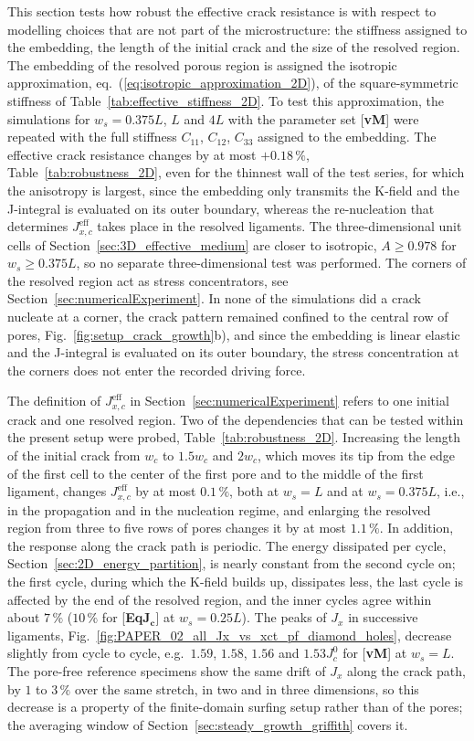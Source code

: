 \documentclass[pdflatex,sn-mathphys-num]{sn-jnl}%
\newcommand{\vMLabel}{[\textbf{vM}]\xspace}
\newcommand{\EqJcLabel}{[\textbf{Eq$\boldsymbol{J_c}$}]\xspace}
\theoremstyle{thmstyleone}%
\theoremstyle{thmstyletwo}%
\theoremstyle{thmstylethree}%
\begin{document}
This section tests how robust the effective crack resistance is with respect to modelling choices that are not part of the microstructure: the stiffness assigned to the embedding, the length of the initial crack and the size of the resolved region. The embedding of the resolved porous region is assigned the isotropic approximation, eq.~(\ref{eq:isotropic_approximation_2D}), of the square-symmetric stiffness of Table~\ref{tab:effective_stiffness_2D}. To test this approximation, the simulations for $w_s = 0.375L$, $L$ and $4L$ with the parameter set \vMLabel were repeated with the full stiffness $C_{11}$, $C_{12}$, $C_{33}$ assigned to the embedding. The effective crack resistance changes by at most $+0.18\,\%$, Table~\ref{tab:robustness_2D}, even for the thinnest wall of the test series, for which the anisotropy is largest, since the embedding only transmits the K-field and the J-integral is evaluated on its outer boundary, whereas the re-nucleation that determines $J_{x,c}^{\text{eff}}$ takes place in the resolved ligaments. The three-dimensional unit cells of Section~\ref{sec:3D_effective_medium} are closer to isotropic, $A \ge 0.978$ for $w_s \ge 0.375L$, so no separate three-dimensional test was performed. The corners of the resolved region act as stress concentrators, see Section~\ref{sec:numericalExperiment}. In none of the simulations did a crack nucleate at a corner, the crack pattern remained confined to the central row of pores, Fig.~\ref{fig:setup_crack_growth}b), and since the embedding is linear elastic and the J-integral is evaluated on its outer boundary, the stress concentration at the corners does not enter the recorded driving force.

The definition of $J_{x,c}^{\text{eff}}$ in Section~\ref{sec:numericalExperiment} refers to one initial crack and one resolved region. Two of the dependencies that can be tested within the present setup were probed, Table~\ref{tab:robustness_2D}. Increasing the length of the initial crack from $w_c$ to $1.5w_c$ and $2w_c$, which moves its tip from the edge of the first cell to the center of the first pore and to the middle of the first ligament, changes $J_{x,c}^{\text{eff}}$ by at most $0.1\,\%$, both at $w_s = L$ and at $w_s = 0.375L$, i.e., in the propagation and in the nucleation regime, and enlarging the resolved region from three to five rows of pores changes it by at most $1.1\,\%$. In addition, the response along the crack path is periodic. The energy dissipated per cycle, Section~\ref{sec:2D_energy_partition}, is nearly constant from the second cycle on; the first cycle, during which the K-field builds up, dissipates less, the last cycle is affected by the end of the resolved region, and the inner cycles agree within about $7\,\%$ ($10\,\%$ for \EqJcLabel at $w_s = 0.25L$). The peaks of $J_x$ in successive ligaments, Fig.~\ref{fig:PAPER_02_all_Jx_vs_xct_pf_diamond_holes}, decrease slightly from cycle to cycle, e.g.\ $1.59$, $1.58$, $1.56$ and $1.53J_c^0$ for \vMLabel at $w_s = L$. The pore-free reference specimens show the same drift of $J_x$ along the crack path, by $1$ to $3\,\%$ over the same stretch, in two and in three dimensions, so this decrease is a property of the finite-domain surfing setup rather than of the pores; the averaging window of Section~\ref{sec:steady_growth_griffith} covers it.
\end{document}
